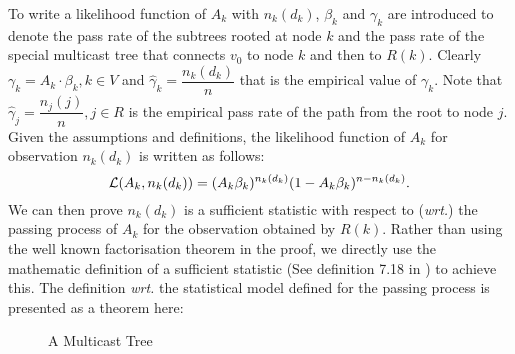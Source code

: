 \documentclass[10pt,onecolumn]{IEEEtran}
\begin{document}
 To write a likelihood function of $A_k$ with $n_k(d_k)$, $\beta_k$ and $\gamma_k$ are introduced to denote the pass rate of the subtrees rooted at node $k$ and the pass rate of the special multicast tree that connects $v_0$ to node $k$ and then to $R(k)$. Clearly $\gamma_k=A_k\cdot\beta_k,  k \in V$ and $\hat\gamma_k=\dfrac{n_k(d_k)}{n}$ that is the empirical value of $\gamma_k$. Note that $\hat\gamma_j=\dfrac{n_j(j)}{n}, j \in R$ is the empirical pass rate of the path from the root to node $j$.
Given the assumptions and definitions,  the likelihood function of $A_k$ for observation $n_k(d_k)$ is written as follows:
\begin{equation}
{\cal L}(A_k, n_k(d_k))=(A_k\beta_k)^{n_k(d_k)}(1-A_k\beta_k)^{n-n_k(d_k)}.
\label{likelihood function}
\end{equation}
We can then prove  $n_k(d_k)$ is a sufficient statistic with respect to ({\it wrt.}) the passing process of $A_k$ for the observation obtained by $R(k)$. Rather than using the well known factorisation theorem in the proof, we directly use the mathematic definition of a sufficient statistic (See definition 7.18 in \cite{RM96}) to achieve this. The definition {\it wrt.} the statistical model defined for the passing process is presented as a theorem here:

\begin{figure}
\begin{center}
\caption{A Multicast Tree} \label{tree example}
\end{center}
\end{figure}
\end{document}
